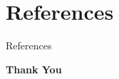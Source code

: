 \documentclass[aspectratio=169, 11pt]{beamer}
\begin{document}
\section{References}
\begin{frame}[allowframebreaks]{References}
    
     
\end{frame}

\begin{frame}
    \centering    
    {\Huge \textbf{\textcolor{amritaMaroon}{Thank You}}}
\end{frame}
\end{document}
